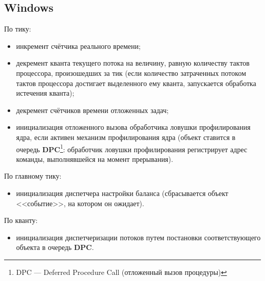 \documentclass[a4paper,14pt]{extarticle}
\begin{document}
\subsection{Windows} 
По тику:
\begin{itemize}
	\item инкремент счётчика реального времени;
	\item декремент кванта текущего потока на величину, равную количеству тактов процессора, произошедших за тик (если количество затраченных потоком тактов процессора достигает выделенного ему кванта, запускается обработка истечения кванта);
	\item декремент счётчиков времени отложенных задач;
    \item инициализация отложенного вызова обработчика ловушки профилирования ядра, если активен механизм профилирования ядра (объект ставится в очередь \textbf{DPC}\footnote{DPC --- Deferred Procedure Call (отложенный вызов процедуры)}: обработчик ловушки профилирования регистрирует адрес команды, выполнявшейся на момент прерывания).
\end{itemize}
По главному тику:
\begin{itemize}
	\item инициализация диспетчера настройки баланса (сбрасывается объект <<событие>>, на котором он ожидает).
\end{itemize}
По кванту:
\begin{itemize}
	\item инициализация диспетчеризации потоков путем постановки соответствующего объекта в очередь \textbf{DPC}.
\end{itemize}

\end{document}
